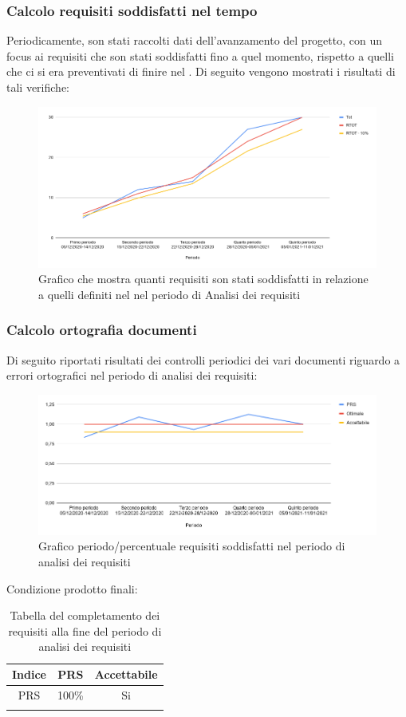 	\subsubsection{Calcolo requisiti soddisfatti nel tempo}
		Periodicamente, son stati raccolti dati dell'avanzamento del progetto, con un focus ai requisiti che son stati soddisfatti fino a quel momento, rispetto a quelli che ci si era preventivati di finire nel .
		Di seguito vengono mostrati i risultati di tali verifiche:
		\begin{figure}[H]
			\centering
			\includegraphics[width=0.8\linewidth]{./res/images/rtot.png}
			\caption{Grafico che mostra quanti requisiti son stati soddisfatti in relazione a quelli definiti nel  nel periodo di Analisi dei requisiti}
			\label{fig:Grafico requisiti soddisfatti nel periodo di Analisi dei Requisiti}
		\end{figure}

		\subsubsection{Calcolo ortografia documenti}
		Di seguito riportati risultati dei controlli periodici dei vari documenti riguardo a errori ortografici nel periodo di analisi dei requisiti:
		\begin{figure}[H]
			\centering
			\includegraphics[width=0.8\linewidth]{./res/images/prs.png}
			\caption{Grafico periodo/percentuale requisiti soddisfatti nel periodo di analisi dei requisiti}
			\label{fig:Grafico PRS periodo di analisi dei requisiti}
		\end{figure}

		Condizione prodotto finali:
		\begin{center}
			\begin{longtable}{|c|c|c|}
			\hline
			\rowcolor{lighter-grayer}
			\textbf{Indice} & \textbf{PRS} & \textbf{Accettabile} \\
			\hline
			\endfirsthead
			\hline
			PRS & 100\% & Si \\
			\hline
			\rowcolor{white}
			\caption{Tabella del completamento dei requisiti alla fine del periodo di analisi dei requisiti}
		\end{longtable}
	\end{center}
